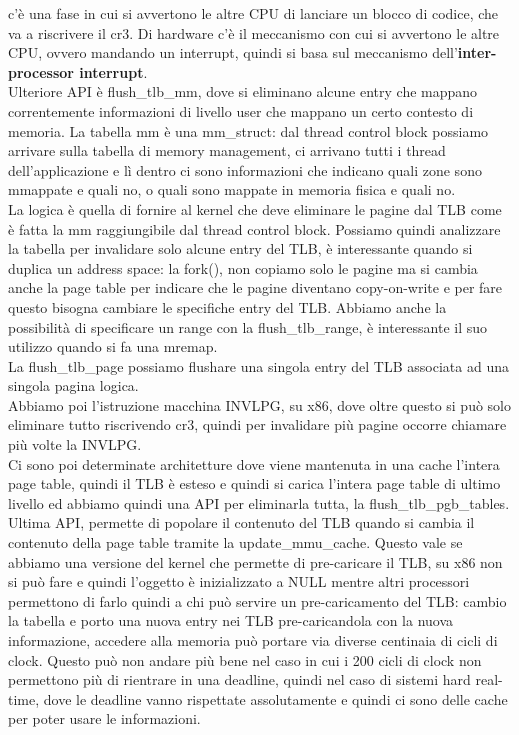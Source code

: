 \documentclass[12pt, oneside]{extbook}
\begin{document}
c'è una fase in cui si avvertono le altre CPU di lanciare un blocco di codice, che va a riscrivere il cr3. Di hardware c'è il meccanismo con cui si avvertono le altre CPU, ovvero mandando un interrupt, quindi si basa sul meccanismo dell'\textbf{inter-processor interrupt}.\\Ulteriore API è \textsf{flush\_tlb\_mm}, dove si eliminano alcune entry che mappano correntemente informazioni di livello user che mappano un certo contesto di memoria. La tabella mm è una \textsf{mm\_struct}: dal thread control block possiamo arrivare sulla tabella di memory management, ci arrivano tutti i thread dell'applicazione e lì dentro ci sono informazioni che indicano quali zone sono mmappate e quali no, o quali sono mappate in memoria fisica e quali no.\\La logica è quella di fornire al kernel che deve eliminare le pagine dal TLB come è fatta la mm raggiungibile dal thread control block. Possiamo quindi analizzare la tabella per invalidare solo alcune entry del TLB, è interessante quando si duplica un address space: la fork(), non copiamo solo le pagine ma si cambia anche la page table per indicare che le pagine diventano copy-on-write e per fare questo bisogna cambiare le specifiche entry del TLB. Abbiamo anche la possibilità di specificare un range con la \textsf{flush\_tlb\_range}, è interessante il suo utilizzo quando si fa una mremap.\\ La \textsf{flush\_tlb\_page} possiamo flushare una singola entry del TLB associata ad una singola pagina logica.\\ Abbiamo poi l'istruzione macchina INVLPG, su x86, dove oltre questo si può solo eliminare tutto riscrivendo cr3, quindi per invalidare più pagine occorre chiamare più volte la INVLPG.\\Ci sono poi determinate architetture dove viene mantenuta in una cache l'intera page table, quindi il TLB è esteso e quindi si carica l'intera page table di ultimo livello ed abbiamo quindi una API per eliminarla tutta, la \textsf{flush\_tlb\_pgb\_tables}.\\ Ultima API, permette di popolare il contenuto del TLB quando si cambia il contenuto della page table tramite la \textsf{update\_mmu\_cache}. Questo vale se abbiamo una versione del kernel che permette di pre-caricare il TLB, su x86 non si può fare e quindi l'oggetto è inizializzato a NULL mentre altri processori permettono di farlo quindi a chi può servire un pre-caricamento del TLB: cambio la tabella e porto una nuova entry nei TLB pre-caricandola con la nuova informazione, accedere alla memoria può portare via diverse centinaia di cicli di clock. Questo può non andare più bene nel caso in cui i 200 cicli di clock non permettono più di rientrare in una deadline, quindi nel caso di sistemi hard real-time, dove le deadline vanno rispettate assolutamente e quindi ci sono delle cache per poter usare le informazioni.
\end{document}
